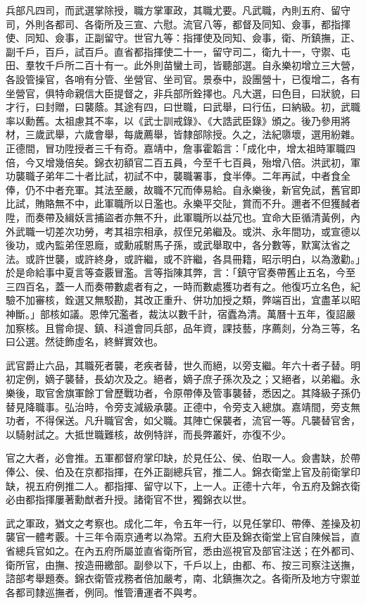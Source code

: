 兵部凡四司，而武選掌除授，職方掌軍政，其職尤要。凡武職，內則五府、留守司，外則各都司、各衛所及三宣、六慰。流官八等，都督及同知、僉事，都指揮使、同知、僉事，正副留守。世官九等：指揮使及同知、僉事，衛、所鎮撫，正、副千戶，百戶，試百戶。直省都指揮使二十一，留守司二，衛九十一，守禦、屯田、羣牧千戶所二百十有一。此外則苗蠻土司，皆聽部選。自永樂初增立三大營，各設管操官，各哨有分管、坐營官、坐司官。景泰中，設團營十，已復增二，各有坐營官，俱特命親信大臣提督之，非兵部所銓擇也。凡大選，曰色目，曰狀貌，曰才行，曰封贈，曰襲蔭。其途有四，曰世職，曰武舉，曰行伍，曰納級。初，武職率以勳舊。太祖慮其不率，以《武士訓戒錄》、《大誥武臣錄》頒之。後乃參用將材，三歲武舉，六歲會舉，每歲薦舉，皆隸部除授。久之，法紀隳壞，選用紛雜。正德間，冒功陞授者三千有奇。嘉靖中，詹事霍韜言：「成化中，增太祖時軍職四倍，今又增幾倍矣。錦衣初額官二百五員，今至千七百員，殆增八倍。洪武初，軍功襲職子弟年二十者比試，初試不中，襲職署事，食半俸。二年再試，中者食全俸，仍不中者充軍。其法至嚴，故職不冗而俸易給。自永樂後，新官免試，舊官即比試，賄賂無不中，此軍職所以日濫也。永樂平交阯，賞而不升。邇者不但獲馘者陞，而奏帶及緝妖言捕盜者亦無不升，此軍職所以益冗也。宜命大臣循清黃例，內外武職一切差次功勞，考其祖宗相承，叔侄兄弟繼及。或洪、永年間功，或宣德以後功，或內監弟侄恩廕，或勳戚駙馬子孫，或武舉取中，各分數等，默寓汰省之法。或許世襲，或許終身，或許繼，或不許繼，各具冊籍，昭示明白，以為激勸。」於是命給事中夏言等查覈冒濫。言等指陳其弊，言：「鎮守官奏帶舊止五名，今至三四百名，蓋一人而奏帶數處者有之，一時而數處獲功者有之。他復巧立名色，紀驗不加審核，銓選又無駁勘，其改正重升、併功加授之類，弊端百出，宜盡革以昭神斷。」部核如議。恩倖冗濫者，裁汰以數千計，宿蠹為清。萬曆十五年，復詔嚴加察核。且嘗命提、鎮、科道會同兵部，品年資，課技藝，序薦剡，分為三等，名曰公選。然徒飾虛名，終鮮實效也。

武官爵止六品，其職死者襲，老疾者替，世久而絕，以旁支繼。年六十者子替。明初定例，嫡子襲替，長幼次及之。絕者，嫡子庶子孫次及之；又絕者，以弟繼。永樂後，取官舍旗軍餘丁曾歷戰功者，令原帶俸及管事襲替，悉因之。其降級子孫仍替見降職事。弘治時，令旁支減級承襲。正德中，令旁支入總旗。嘉靖間，旁支無功者，不得保送。凡升職官舍，如父職。其陣亡保襲者，流官一等。凡襲替官舍，以騎射試之。大抵世職難核，故例特詳，而長弊叢奸，亦復不少。

官之大者，必會推。五軍都督府掌印缺，於見任公、侯、伯取一人。僉書缺，於帶俸公、侯、伯及在京都指揮，在外正副總兵官，推二人。錦衣衛堂上官及前衛掌印缺，視五府例推二人。都指揮、留守以下，上一人。正德十六年，令五府及錦衣衛必由都指揮屢著勳猷者升授。諸衛官不世，獨錦衣以世。

武之軍政，猶文之考察也。成化二年，令五年一行，以見任掌印、帶俸、差操及初襲官一體考覈。十三年令兩京通考以為常。五府大臣及錦衣衛堂上官自陳候旨，直省總兵官如之。在內五府所屬並直省衛所官，悉由巡視官及部官注送；在外都司、衛所官，由撫、按造冊繳部。副參以下，千戶以上，由都、布、按三司察注送撫，諮部考舉題奏。錦衣衛管戎務者倍加嚴考，南、北鎮撫次之。各衛所及地方守禦並各都司隸巡撫者，例同。惟管漕運者不與考。
